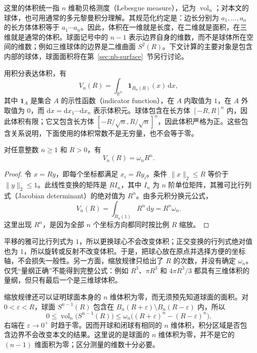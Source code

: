 \documentclass[UTF8,12pt,a4paper,fontset=fandol]{ctexart}
\begin{document}
这里的体积统一指 $n$ 维勒贝格测度（Lebesgue measure），记为 $\operatorname{vol}_n$；对本文的球体，也可用通常的多元黎曼积分理解。其规范化约定是：边长分别为 $a_1,\ldots,a_n$ 的长方体体积等于 $a_1\cdots a_n$。因此，体积在一维就是长度，在二维就是面积，在三维就是通常的体积。球面记号中的 $n-1$ 表示边界自身的维数，而不是球体所在空间的维数；例如三维球体的边界是二维曲面 $S^2(R)$。下文计算的主要对象是包含内部的球体，球面面积将在第~\ref{sec:nb-surface}~节另行讨论。

用积分表达体积，有
\[
  V_n(R)=\int_{\mathbb R^n}\mathbf1_{B_n(R)}(x)\,\mathrm dx,
\]
其中 $\mathbf1_A$ 是集合 $A$ 的示性函数（indicator function），在 $A$ 内取值为 $1$，在 $A$ 外取值为 $0$，而 $\mathrm dx=\mathrm dx_1\cdots\mathrm dx_n$ 表示体积元。球体包含在长方体 $[-R,R]^n$ 内，因此体积有限；它又包含长方体 $[-R/\sqrt n,R/\sqrt n]^n$，因此体积严格为正。这些包含关系说明，下面使用的体积常数不是无穷量，也不会等于零。

\begin{proposition}[半径的缩放规律]\label{prop:nb-scaling}
对任意整数 $n\geq1$ 和 $R>0$，有
\begin{equation}\label{eq:nb-scaling}
  V_n(R)=\omega_nR^n.
\end{equation}
\end{proposition}

\begin{proof}
令 $x=Ry$，即每个坐标都满足 $x_i=Ry_i$。条件 $\|x\|_2\leq R$ 等价于 $\|y\|_2\leq1$。此线性变换的矩阵是 $RI_n$，其中 $I_n$ 为 $n$ 阶单位矩阵，其雅可比行列式（Jacobian determinant）的绝对值为 $R^n$。由多元积分换元公式，
\[
  V_n(R)=\int_{B_n(1)}R^n\,\mathrm dy=R^n\omega_n.
\]
这里出现 $R^n$，是因为全部 $n$ 个坐标方向都同时按比例 $R$ 缩放。
\end{proof}

平移的雅可比行列式为 $1$，所以更换球心不会改变体积；正交变换的行列式绝对值也为 $1$，所以旋转或反射不改变体积。于是，把球心放在原点并选择方便的坐标轴，不会损失一般性。另一方面，缩放规律只给出了 $R$ 的次数，并没有确定 $\omega_n$。仅凭“量纲正确”不能得到完整公式：例如 $R^3$、$\pi R^3$ 和 $4\pi R^3/3$ 都具有三维体积的量纲，但只有最后一个是三维球体积。

缩放规律还可以证明球面本身的 $n$ 维体积为零，而无须预先知道球面的面积。对 $0<\varepsilon<R$，球面 $S^{n-1}(R)$ 包含在 $B_n(R+\varepsilon)\setminus B_n(R-\varepsilon)$ 内，所以
\[
  0\leq\operatorname{vol}_n\bigl(S^{n-1}(R)\bigr)
  \leq\omega_n\bigl((R+\varepsilon)^n-(R-\varepsilon)^n\bigr).
\]
右端在 $\varepsilon\to0^+$ 时趋于零。因而开球和闭球有相同的 $n$ 维体积，积分区域是否包含边界不会改变本文的结果。这里说的是球面的 $n$ 维体积为零，并不是它的 $(n-1)$ 维面积为零；区分测量的维数十分必要。
\end{document}

